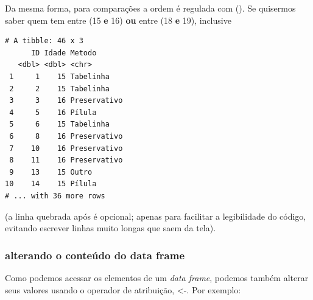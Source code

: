 \documentclass[
]{article}
\newenvironment{Shaded}{\begin{snugshade}}{\end{snugshade}}
\newcommand{\DecValTok}[1]{\textcolor[rgb]{0.00,0.00,0.81}{#1}}
\newcommand{\FloatTok}[1]{\textcolor[rgb]{0.00,0.00,0.81}{#1}}
\newcommand{\FunctionTok}[1]{\textcolor[rgb]{0.00,0.00,0.00}{#1}}
\newcommand{\NormalTok}[1]{#1}
\newcommand{\OtherTok}[1]{\textcolor[rgb]{0.56,0.35,0.01}{#1}}
\newcommand{\SpecialCharTok}[1]{\textcolor[rgb]{0.00,0.00,0.00}{#1}}
\begin{document}
Da mesma forma, para comparações a ordem é regulada com (). Se quisermos
saber quem tem entre (15 \textbf{e} 16) \textbf{ou} entre (18 \textbf{e}
19), inclusive

\begin{Shaded}
\end{Shaded}

\begin{verbatim}
# A tibble: 46 x 3
      ID Idade Metodo      
   <dbl> <dbl> <chr>       
 1     1    15 Tabelinha   
 2     2    15 Tabelinha   
 3     3    16 Preservativo
 4     5    16 Pílula      
 5     6    15 Tabelinha   
 6     8    16 Preservativo
 7    10    16 Preservativo
 8    11    16 Preservativo
 9    13    15 Outro       
10    14    15 Pílula      
# ... with 36 more rows
\end{verbatim}

(a linha quebrada após \textbar{} é opcional; apenas para facilitar a
legibilidade do código, evitando escrever linhas muito longas que saem
da tela).

\hypertarget{alterando-o-conteuxfado-do-data-frame}{%
\subsubsection{alterando o conteúdo do data
frame}\label{alterando-o-conteuxfado-do-data-frame}}

Como podemos acessar os elementos de um \emph{data frame}, podemos
também alterar seus valores usando o operador de atribuição, \textless-.
Por exemplo:

\begin{Shaded}
\end{Shaded}
\end{document}
